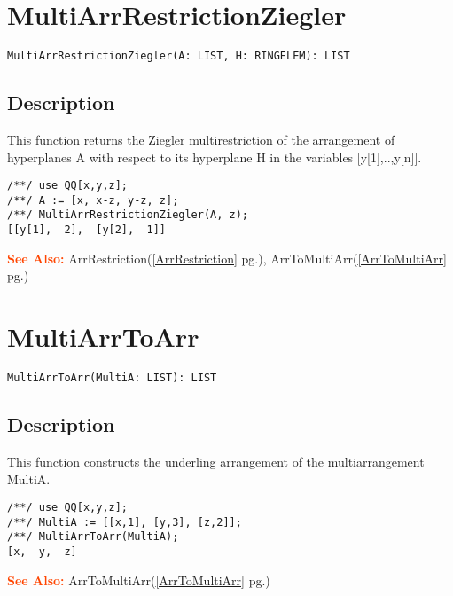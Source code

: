 \documentclass[a4paper]{mybook}
\newenvironment{command}{}{} %
\newcommand\SeeAlso{\par\textcolor{OrangeRed}{\textbf{\large See Also: }}}
\begin{document}
\section{MultiArrRestrictionZiegler}
\label{MultiArrRestrictionZiegler}
\begin{command} %


\begin{Verbatim}[label=syntax, rulecolor=\color{MidnightBlue},
frame=single]
MultiArrRestrictionZiegler(A: LIST, H: RINGELEM): LIST 
\end{Verbatim}


\subsection*{Description}

This function returns the Ziegler multirestriction of the arrangement of
hyperplanes A with respect to its hyperplane H in the variables [y[1],..,y[n]].
\begin{Verbatim}[label=example, rulecolor=\color{PineGreen}, frame=single]
/**/ use QQ[x,y,z];	
/**/ A := [x, x-z, y-z, z];
/**/ MultiArrRestrictionZiegler(A, z);
[[y[1],  2],  [y[2],  1]]
\end{Verbatim}


\SeeAlso %
  ArrRestriction(\ref{ArrRestriction} pg.\pageref{ArrRestriction}), 
    ArrToMultiArr(\ref{ArrToMultiArr} pg.\pageref{ArrToMultiArr})
\end{command} %

\section{MultiArrToArr}
\label{MultiArrToArr}
\begin{command} %


\begin{Verbatim}[label=syntax, rulecolor=\color{MidnightBlue},
frame=single]
MultiArrToArr(MultiA: LIST): LIST 
\end{Verbatim}


\subsection*{Description}

This function constructs the underling arrangement of the
multiarrangement MultiA.
\begin{Verbatim}[label=example, rulecolor=\color{PineGreen}, frame=single]
/**/ use QQ[x,y,z];
/**/ MultiA := [[x,1], [y,3], [z,2]];
/**/ MultiArrToArr(MultiA);
[x,  y,  z]
\end{Verbatim}


\SeeAlso %
  ArrToMultiArr(\ref{ArrToMultiArr} pg.\pageref{ArrToMultiArr})
\end{command} %
\end{document}

